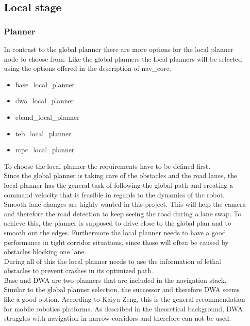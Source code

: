 \subsection{Local stage}
\subsubsection{Planner}
In contrast to the global planner there are more options for the local planner node to choose from. Like the global planners the local planners will be selected using the options offered in the description of nav\_core\cite{navcore}.

\begin{itemize}
	\item base\_local\_planner
	\item dwa\_local\_planner
	\item eband\_local\_planner
	\item teb\_local\_planner
	\item mpc\_local\_planner
\end{itemize}

To choose the local planner the requirements have to be defined first.\\

Since the global planner is taking care of the obstacles and the road lanes, the local planner has the general task of following the global path and creating a command velocity that is feasible in regards to the dynamics of the robot.\\

Smooth lane changes are highly wanted in this project. This will help the camera and therefore the road detection to keep seeing the road during a lane swap. To achieve this, the planner is supposed to drive close to the global plan and to smooth out the edges.
Furthermore the local planner needs to have a good performance in tight corridor situations, since those will often be caused by obstacles blocking one lane.\\

During all of this the local planner needs to use the information of lethal obstacles to prevent crashes in its optimized path.\\


Base and DWA are two planners that are included in the navigation stack. Similar to the global planner selection, the successor and therefore DWA seems like a good option. According to Kaiyu Zeng, this is the general recommendation for mobile robotics platforms\cite{navtuningguide}. As described in the theoretical background, DWA struggles with navigation in narrow corridors and therefore can not be used.

